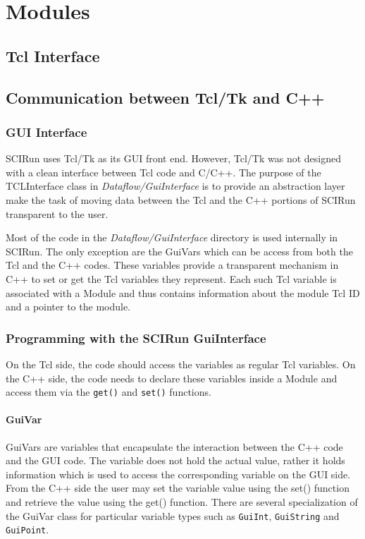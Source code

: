 \documentclass[fleqn,12pt,openany]{book}
\begin{document}
\chapter{Modules}

\section{Tcl Interface}


\section{Communication between Tcl/Tk and C++}

\subsection{GUI Interface}

SCIRun uses Tcl/Tk as its GUI front end.
However, Tcl/Tk was not designed with a clean interface between Tcl code and C/C++.
The purpose of the TCLInterface class in \emph{Dataflow/GuiInterface} is to
provide an abstraction layer make the task of moving data between the Tcl and
the C++ portions of SCIRun transparent to the user.

Most of the code in the \emph{Dataflow/GuiInterface} directory is used internally in SCIRun.
The only exception are the GuiVars which can be access from both the Tcl and the C++ codes.
These variables provide a transparent mechanism in C++ to set or get the Tcl variables
they represent.
Each such Tcl variable is associated with a Module and thus contains information
about the module Tcl ID and a pointer to the module.

\subsection{Programming with the SCIRun GuiInterface}

On the Tcl side, the code should access the variables as regular Tcl variables.
On the C++ side, the code needs to declare these variables inside a Module and
access them via the \texttt{get()} and \texttt{set()} functions.

\subsubsection{GuiVar}

GuiVars are variables that encapsulate the interaction between the C++ code and
the GUI code.
The variable does not hold the actual value, rather it holds information which
is used to access the corresponding variable on the GUI side.
From the C++ side the user may set the variable value using the set() function and
retrieve the value using the get() function.
There are several specialization of the GuiVar class for particular variable types
such as \texttt{GuiInt}, \texttt{GuiString} and \texttt{GuiPoint}.
\end{document}
